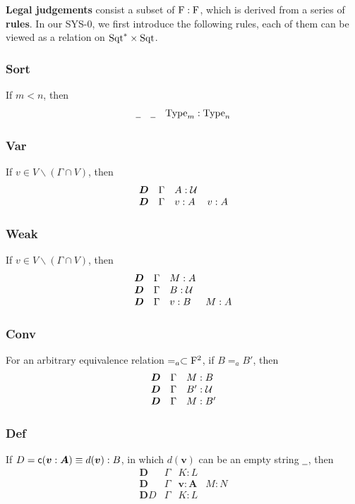\textbf{Legal judgements} consist a subset of $\mathrm{F} : \mathrm{F}$, which is derived from a series of \textbf{rules}. In our SYS-0, we first introduce the following rules, each of them can be viewed as a relation on $\mathrm{Sqt}^* \times \mathrm{Sqt}$. 


\subsubsection*{Sort}
If $m < n$, then 
\[
  \begin{array}{lll}
    \mathord{\underline{\hspace{0.5em}}} & \mathord{\underline{\hspace{0.5em}}} & \mathrm{Type}_m : \mathrm{Type}_n
  \end{array}
\]




\subsubsection*{Var}
If $v \in V \smallsetminus (\Gamma \cap V)$, then
\[
  \begin{array}{llll}
    \boldsymbol{D} & \Gamma & A : \mathcal{U}  & 
    \\
    \boldsymbol{D} & \Gamma & v : A & v : A
  \end{array}
\]



\subsubsection*{Weak}
If $v \in V \smallsetminus (\Gamma \cap V)$, then
\[
  \begin{array}{llll}
    \boldsymbol{D} & \Gamma & M : A & 
    \\ 
    \boldsymbol{D} & \Gamma & B : \mathcal{U}   &
    \\
    \boldsymbol{D} & \Gamma & v : B & M : A
  \end{array}
\]


\subsubsection*{Conv}
For an arbitrary equivalence relation $=_a \subset \mathrm{F}^2$, if $B =_a B'$, then
\[
  \begin{array}{lll}
    \boldsymbol{D} & \Gamma & M : B
    \\ 
    \boldsymbol{D} & \Gamma & B' : \mathcal{U} 
    \\
    \boldsymbol{D} & \Gamma & M : B'
  \end{array}
\]



\subsubsection*{Def}
If $D = \text{{\sffamily c}} (\boldsymbol{v} : \boldsymbol{A}) \equiv d(\boldsymbol{v}) : B$, in which $d(\bm v)$ can be an empty string $\mathord{\underline{\hspace{0.5em}}}$, then
\[
  \begin{array}{llll}
    \bm D & \Gamma & K : L  &
    \\ 
    \bm D & \Gamma & \bm v : \bm A & M : N 
    \\
    \bm D D & \Gamma & K:L &
  \end{array}
\]





